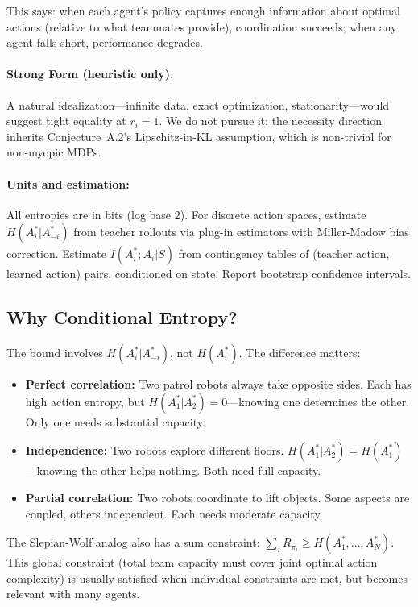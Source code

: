 \documentclass[10pt, letterpaper]{article}
\begin{document}
\bigskip

This says: when each agent's policy captures enough information about optimal actions (relative to what teammates provide), coordination succeeds; when any agent falls short, performance degrades.

\paragraph{Strong Form (heuristic only).} A natural idealization---infinite data, exact optimization, stationarity---would suggest tight equality at $r_i = 1$. We do not pursue it: the necessity direction inherits Conjecture~A.2's Lipschitz-in-KL assumption, which is non-trivial for non-myopic MDPs.

\paragraph{Units and estimation:} All entropies are in bits (log base 2). For discrete action spaces, estimate $H(A_i^*|A_{-i}^*)$ from teacher rollouts via plug-in estimators with Miller-Madow bias correction. Estimate $I(A_i^*; A_i|S)$ from contingency tables of (teacher action, learned action) pairs, conditioned on state. Report bootstrap confidence intervals.

\subsection{Why Conditional Entropy?}

The bound involves $H(A_i^*|A_{-i}^*)$, not $H(A_i^*)$. The difference matters:
\begin{itemize}
    \item \textbf{Perfect correlation:} Two patrol robots always take opposite sides. Each has high action entropy, but $H(A_1^*|A_2^*) = 0$---knowing one determines the other. Only one needs substantial capacity.
    \item \textbf{Independence:} Two robots explore different floors. $H(A_1^*|A_2^*) = H(A_1^*)$---knowing the other helps nothing. Both need full capacity.
    \item \textbf{Partial correlation:} Two robots coordinate to lift objects. Some aspects are coupled, others independent. Each needs moderate capacity.
\end{itemize}
The Slepian-Wolf analog also has a sum constraint: $\sum_i R_{\pi_i} \geq H(A_1^*, \ldots, A_N^*)$. This global constraint (total team capacity must cover joint optimal action complexity) is usually satisfied when individual constraints are met, but becomes relevant with many agents.
\end{document}

